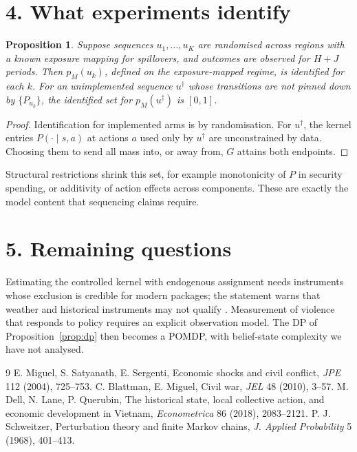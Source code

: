 \documentclass[11pt]{article}
\newtheorem{proposition}[theorem]{Proposition}
\theoremstyle{definition}
\begin{document}
\section*{4. What experiments identify}
\begin{proposition}\label{prop:exp}
Suppose sequences $u_1,\dots,u_K$ are randomised across regions with a known exposure mapping for spillovers, and outcomes
are observed for $H+J$ periods. Then $p_M(u_k)$, defined on the exposure-mapped regime, is identified for each $k$. For an
unimplemented sequence $u^\dagger$ whose transitions are not pinned down by $\{P_{u_k}\}$, the identified set for
$p_M(u^\dagger)$ is $[0,1]$.
\end{proposition}
\begin{proof}
Identification for implemented arms is by randomisation. For $u^\dagger$, the kernel entries $P(\cdot\mid s,a)$ at actions
$a$ used only by $u^\dagger$ are unconstrained by data. Choosing them to send all mass into, or away from, $G$ attains both
endpoints.
\end{proof}
Structural restrictions shrink this set, for example monotonicity of $P$ in security spending, or additivity of action
effects across components. These are exactly the model content that sequencing claims require.

\section*{5. Remaining questions}
Estimating the controlled kernel with endogenous assignment needs instruments whose exclusion is credible for modern
packages; the statement warns that weather and historical instruments may not qualify \cite{mss,bm,dlq}. Measurement of
violence that responds to policy requires an explicit observation model. The DP of Proposition~\ref{prop:dp} then becomes a
POMDP, with belief-state complexity we have not analysed.

\begin{thebibliography}{9}
 E. Miguel, S. Satyanath, E. Sergenti, Economic shocks and civil conflict, \emph{JPE} 112 (2004), 725--753.
 C. Blattman, E. Miguel, Civil war, \emph{JEL} 48 (2010), 3--57.
 M. Dell, N. Lane, P. Querubin, The historical state, local collective action, and economic development in Vietnam, \emph{Econometrica} 86 (2018), 2083--2121.
 P. J. Schweitzer, Perturbation theory and finite Markov chains, \emph{J. Applied Probability} 5 (1968), 401--413.
\end{thebibliography}
\end{document}
